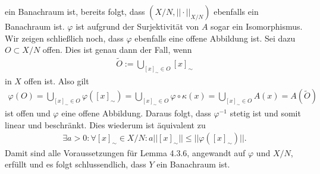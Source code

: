 \begin{solution}
\begin{enumerate}[label = (\roman*)]
  ein Banachraum ist, bereits folgt, dass $(X/N, ||\cdot||_{X/N})$ ebenfalls ein
  Banachraum ist. $\varphi$ ist aufgrund der Surjektivität von $A$ sogar ein
  Isomorphismus. Wir zeigen schließlich noch, dass $\varphi$ ebenfalls eine offene Abbildung ist.
  Sei dazu $O \subset X/N$ offen. Dies ist genau dann der Fall, wenn
  \begin{align*}
     \widetilde{O} :=\bigcup_{[x]_\sim \in O} [x]_{\sim}
  \end{align*}
  in $X$ offen ist. Also gilt
  \begin{align*}
    \varphi(O) = \bigcup_{[x]_\sim \in O} \varphi([x]_{\sim})
    = \bigcup_{[x]_\sim \in O} \varphi \circ \kappa(x)
    = \bigcup_{[x]_\sim \in O} A(x)
    = A(\widetilde{O})
  \end{align*}
  ist offen und $\varphi$ eine offene Abbildung. Daraus folgt, dass $\varphi^{-1}$
  stetig ist und somit linear und beschränkt. Dies wiederum ist äquivalent zu
  \begin{align*}
    \exists a > 0: \forall [x]_\sim \in X/N: a||[x]_\sim|| \leq ||\varphi([x]_\sim)||.
  \end{align*}
  Damit sind alle Voraussetzungen für Lemma 4.3.6, angewandt auf $\varphi$ und $X/N$, erfüllt
  und es folgt schlussendlich, dass $Y$ ein Banachraum ist.
\end{enumerate}
\end{solution}
